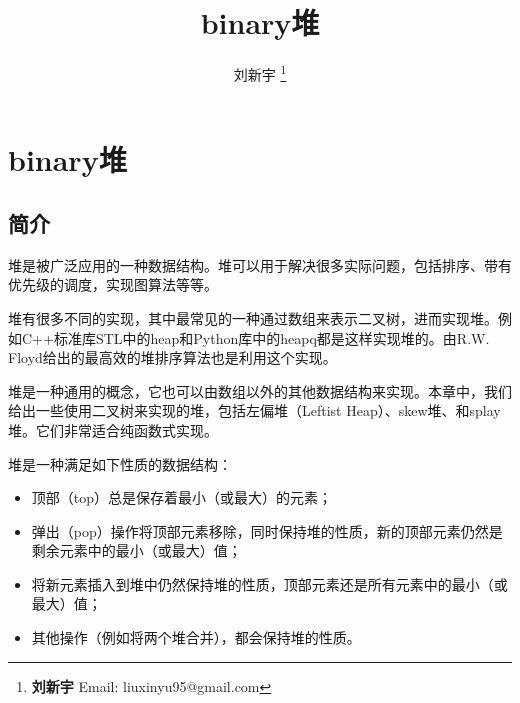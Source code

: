 \documentclass[UTF8]{article}
\begin{document}


\title{binary堆}

\author{刘新宇
\thanks{{\bfseries 刘新宇 } \newline
  Email: liuxinyu95@gmail.com \newline}
  }

\maketitle
\fi


\ifx\wholebook\relax
\chapter{binary堆}
\fi

\section{简介}
\label{introduction}

堆是被广泛应用的一种数据结构。堆可以用于解决很多实际问题，包括排序、带有优先级的调度，实现图算法等等\cite{wiki-heap}。

堆有很多不同的实现，其中最常见的一种通过数组来表示二叉树\cite{CLRS}，进而实现堆。例如C++标准库STL中的heap和Python库中的heapq都是这样实现堆的。由R.W. Floyd给出的最高效的堆排序算法也是利用这个实现\cite{wiki-heapsort}\cite{rosetta-heapsort}。

堆是一种通用的概念，它也可以由数组以外的其他数据结构来实现。本章中，我们给出一些使用二叉树来实现的堆，包括左偏堆（Leftist Heap）、skew堆、和splay堆。它们非常适合纯函数式实现\cite{okasaki-book}。

堆是一种满足如下性质的数据结构：
\begin{itemize}
\item 顶部（top）总是保存着最小（或最大）的元素；
\item 弹出（pop）操作将顶部元素移除，同时保持堆的性质，新的顶部元素仍然是剩余元素中的最小（或最大）值；
\item 将新元素插入到堆中仍然保持堆的性质，顶部元素还是所有元素中的最小（或最大）值；
\item 其他操作（例如将两个堆合并），都会保持堆的性质。
\end{itemize}
\end{document}
